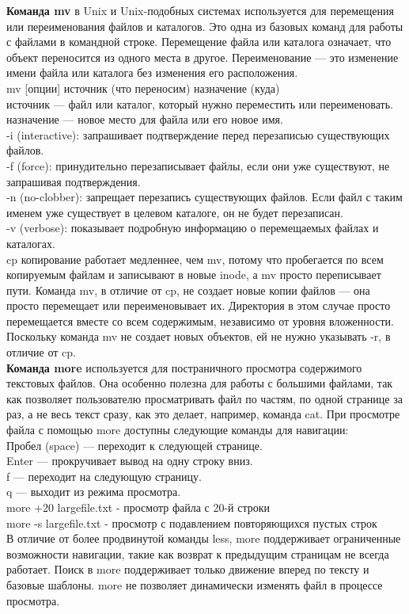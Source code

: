 \noindent \textbf{Команда mv} в Unix и Unix-подобных системах используется для перемещения или переименования файлов и каталогов. Это одна из базовых команд для работы с файлами в командной строке. Перемещение файла или каталога означает, что объект переносится из одного места в другое. Переименование — это изменение имени файла или каталога без изменения его расположения. \\
mv [опции] источник (что переносим) назначение (куда) \\
источник — файл или каталог, который нужно переместить или переименовать. \\
назначение — новое место для файла или его новое имя. \\
-i (interactive): запрашивает подтверждение перед перезаписью существующих файлов. \\
-f (force): принудительно перезаписывает файлы, если они уже существуют, не запрашивая подтверждения. \\
-n (no-clobber): запрещает перезапись существующих файлов. Если файл с таким именем уже существует в целевом каталоге, он не будет перезаписан. \\
-v (verbose): показывает подробную информацию о перемещаемых файлах и каталогах. \\
cp копирование работает медленнее, чем mv, потому что пробегается по всем копируемым файлам и записывают в новые inode, а mv просто переписывает пути. Команда mv, в отличие от cp, не создает новые копии файлов — она просто перемещает или переименовывает их. Директория в этом случае просто перемещается вместе со всем содержимым, независимо от уровня вложенности. Поскольку команда mv не создает новых объектов, ей не нужно указывать -r, в отличие от cp. \\

\noindent \textbf{Команда more} используется для постраничного просмотра содержимого текстовых файлов. Она особенно полезна для работы с большими файлами, так как позволяет пользователю просматривать файл по частям, по одной странице за раз, а не весь текст сразу, как это делает, например, команда cat. При просмотре файла с помощью more доступны следующие команды для навигации: \\
Пробел (space) — переходит к следующей странице. \\
Enter — прокручивает вывод на одну строку вниз. \\
f — переходит на следующую страницу. \\
q — выходит из режима просмотра. \\
more +20 largefile.txt - просмотр файла с 20-й строки \\
more -s largefile.txt - просмотр с подавлением повторяющихся пустых строк \\
В отличие от более продвинутой команды less, more поддерживает ограниченные возможности навигации, такие как возврат к предыдущим страницам не всегда работает. Поиск в more поддерживает только движение вперед по тексту и базовые шаблоны. more не позволяет динамически изменять файл в процессе просмотра. \\

